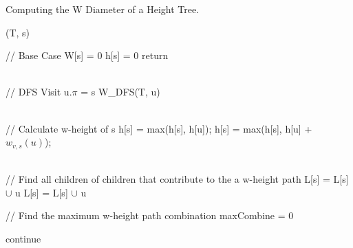 

\begin{algorithm}[h]{}
\caption{Computing the W Diameter of a Height Tree.}
\begin{algorithmic}[1]
    \label{algo:dp}%

    (T, s)


    \State // Base Case
        \State W[s] = 0
        \State h[s] = 0
        \State return
    \EndIf


    \\
    \State // DFS Visit
            \State u.$\pi$ = s
            \State W\_DFS(T, u)
        \EndIf
    \EndFor

    \\

    \State // Calculate w-height of s
            \State h[s] = max(h[s], h[u]);
        \Else
                \State h[s] = max(h[s], h[u] + $w_{v, s}(u)$);
            \EndFor
        \EndIf
    \EndFor

    \\
    \State // Find all children of children that contribute to the a w-height path
            \State L[s] = L[s] $\cup$ u
        \Else
                    \State L[s] = L[s] $\cup$ u
                \EndIf
            \EndFor
        \EndIf

    \EndFor

    \State // Find the maximum w-height path combination
    \State maxCombine = 0


                \State continue
            \EndIf


\end{algorithmic}
\end{algorithm}
